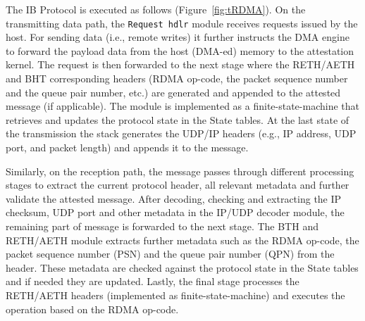  The IB Protocol is executed as follows (Figure~\ref{fig:tRDMA}). On the transmitting data path, the {\tt Request hdlr} module receives requests issued by the host. For sending data (i.e., remote writes) it further instructs the DMA engine to forward the payload data from the host (DMA-ed) memory to the attestation kernel. The request is then forwarded to the next stage where the RETH/AETH and BHT corresponding headers (RDMA op-code, the packet sequence number and the queue pair number, etc.) are generated and appended to the attested message (if applicable). The module is implemented as a finite-state-machine that retrieves and updates the protocol state in the State tables. At the last state of the transmission the stack generates the UDP/IP headers (e.g., IP address, UDP port, and packet length) and appends it to the message.

Similarly, on the reception path, the message passes through different processing stages to extract the current protocol header, all relevant metadata and further validate the attested message. After decoding, checking and extracting the IP checksum, UDP port and other metadata in the IP/UDP decoder module, the remaining part of message is forwarded to the next stage. The BTH and RETH/AETH module extracts further metadata such as the RDMA op-code, the packet sequence number (PSN) and the queue pair number (QPN) from the header. These metadata are checked against the protocol state in the State tables and if needed they are updated. Lastly, the final stage processes the RETH/AETH headers (implemented as finite-state-machine) and executes the operation based on the RDMA op-code. %




